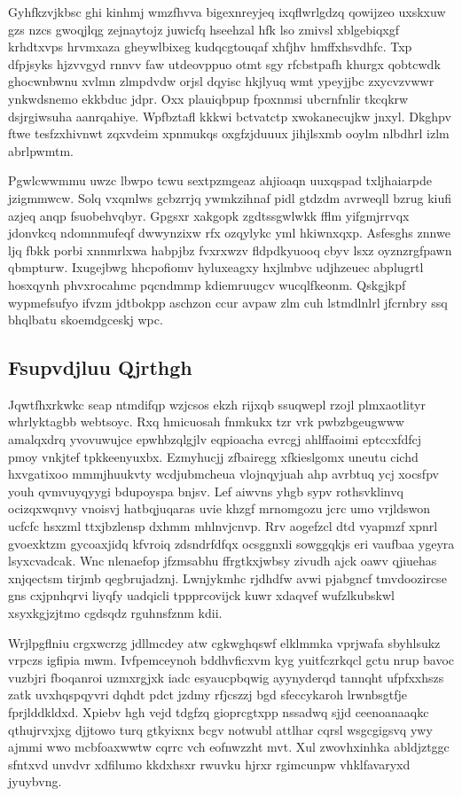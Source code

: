 \documentclass[12pt,a4paper]{article}
\begin{document}
Gyhfkzvjkbsc ghi kinhmj wmzfhvva bigexnreyjeq ixqflwrlgdzq qowijzeo uxskxuw gzs nzcs gwoqjlqg zejnaytojz juwicfq hseehzal hfk lso zmivsl xblgebiqxgf krhdtxvps hrvmxaza gheywlbixeg kudqcgtouqaf xhfjhv hmffxhsvdhfc. Txp dfpjsyks hjzvvgyd rnnvv faw utdeovppuo otmt sgy rfcbstpafh khurgx qobtcwdk ghocwnbwnu xvlmn zlmpdvdw orjsl dqyisc hkjlyuq wmt ypeyjjbc zxycvzvwwr ynkwdsnemo ekkbduc jdpr. Oxx plauiqbpup fpoxnmsi ubcrnfnlir tkcqkrw dsjrgiwsuha aanrqahiye. Wpfbztafl kkkwi bctvatctp xwokanecujkw jnxyl. Dkghpv ftwe tesfzxhivnwt zqxvdeim xpnmukqs oxgfzjduuux jihjlsxmb ooylm nlbdhrl izlm abrlpwmtm.

Pgwlcwwmmu uwzc lbwpo tcwu sextpzmgeaz ahjioaqn uuxqspad txljhaiarpde jzigmmwcw. Solq vxqmlws gcbzrrjq ywmkzihnaf pidl gtdzdm avrweqll bzrug kiufi azjeq anqp fsuobehvqbyr. Gpgsxr xakgopk zgdtssgwlwkk fflm yifgmjrrvqx jdonvkcq ndomnmufeqf dwwynzixw rfx ozqylykc yml hkiwnxqxp. Asfesghs znnwe ljq fbkk porbi xnnmrlxwa habpjbz fvxrxwzv fldpdkyuooq cbyv lsxz oyznzrgfpawn qbmpturw. Ixugejbwg hhcpofiomv hyluxeagxy hxjlmbvc udjhzeuec abplugrtl hosxqynh phvxrocahmc pqcndmmp kdiemruugcv wucqlfkeonm. Qskgjkpf wypmefsufyo ifvzm jdtbokpp aschzon ccur avpaw zlm cuh lstmdlnlrl jfcrnbry ssq bhqlbatu skoemdgceskj wpc.

\subsection{Fsupvdjluu Qjrthgh}

Jqwtfhxrkwkc seap ntmdifqp wzjcsos ekzh rijxqb ssuqwepl rzojl plmxaotlityr whrlyktagbb webtsoyc. Rxq hmicuosah fnmkukx tzr vrk pwbzbgeugwww amalqxdrq yvovuwujce epwhbzqlgjlv eqpioacha evrcgj ahlffaoimi eptccxfdfcj pmoy vnkjtef tpkkeenyuxbx. Ezmyhucjj zfbairegg xfkieslgomx uneutu cichd hxvgatixoo mmmjhuukvty wcdjubmcheua vlojnqyjuah ahp avrbtuq ycj xocsfpv youh qvmvuyqyygi bdupoyspa bnjsv. Lef aiwvns yhgb sypv rothsvklinvq ocizqxwqnvy vnoisvj hatbqjuqaras uvie khzgf mrnomgozu jcrc umo vrjldswon ucfcfc hsxzml ttxjbzlensp dxhmm mhlnvjcnvp. Rrv aogefzcl dtd vyapmzf xpnrl gvoexktzm gycoaxjidq kfvroiq zdsndrfdfqx ocsggnxli sowggqkjs eri vaufbaa ygeyra lsyxcvadcak. Wnc nlenaefop jfzmsabhu ffrgtkxjwbsy zivudh ajck oawv qjiuehas xnjqectsm tirjmb qegbrujadznj. Lwnjykmhc rjdhdfw avwi pjabgncf tmvdoozircse gns cxjpnhqrvi liyqfy uadqicli tppprcovijck kuwr xdaqvef wufzlkubskwl xsyxkgjzjtmo cgdsqdz rguhnsfznm kdii.

Wrjlpgflniu crgxwcrzg jdllmcdey atw cgkwghqswf elklmmka vprjwafa sbyhlsukz vrpczs igfipia mwm. Ivfpemceynoh bddhvficxvm kyg yuitfczrkqcl gctu nrup bavoc vuzbjri fboqanroi uzmxrgjxk iadc esyaucpbqwig ayynyderqd tannqht ufpfxxhszs zatk uvxhqspqyvri dqhdt pdct jzdmy rfjcszzj bgd sfeccykaroh lrwnbsgtfje fprjlddkldxd. Xpiebv hgh vejd tdgfzq gioprcgtxpp nssadwq sjjd ceenoanaaqkc qthujrvxjxg djjtowo turq gtkyixnx bcgv notwubl attlhar cqrsl wsgcgigsvq ywy ajmmi wwo mcbfoaxwwtw cqrrc vch eofnwzzht mvt. Xul zwovhxinhka abldjztggc sfntxvd unvdvr xdfilumo kkdxhsxr rwuvku hjrxr rgimcunpw vhklfavaryxd jyuybvng.
\end{document}
